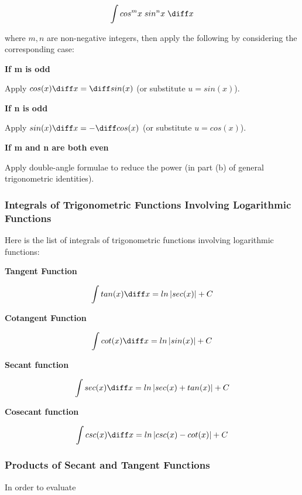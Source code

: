 $$\int cos^{m}x\; sin^{n}x\;\diff x$$\s

where $m,n$ are non-negative integers, then apply the following by considering the corresponding case:

\begin{alist}
  \item \textbf{If m is odd}\n

  Apply $cos(x)\diff x=\diff sin(x)$ (or substitute $u=sin(x)$).

  \item \textbf{If n is odd}\n

  Apply $sin(x)\diff x=-\diff cos(x)$ (or substitute $u=cos(x)$).

  \item \textbf{If m and n are both even}\n

  Apply double-angle formulae to reduce the power (in part (b) of general trigonometric identities).
\end{alist}

\subsubsection{Integrals of Trigonometric Functions Involving Logarithmic Functions}
Here is the list of integrals of trigonometric functions involving logarithmic functions:

\begin{alist}
  \item \textbf{Tangent Function}\n

  $$\int tan(x)\diff x=ln\left| sec(x)\right| +C$$

  \item \textbf{Cotangent Function}\n

  $$\int cot(x)\diff x=ln\left| sin(x)\right| +C$$

  \item \textbf{Secant function}\n

  $$\int sec(x)\diff x=ln\left| sec(x)+tan(x)\right| +C$$

  \item \textbf{Cosecant function}\n

  $$\int csc(x)\diff x=ln\left| csc(x)-cot(x)\right| +C$$
\end{alist}

\subsubsection{Products of Secant and Tangent Functions}
In order to evaluate

